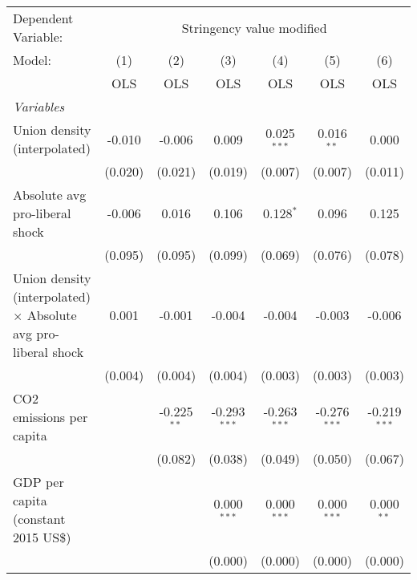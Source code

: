 
\begingroup
\centering
\begin{tabular}{lcccccc}
   \toprule
   Dependent Variable: & \multicolumn{6}{c}{Stringency value modified}\\
   Model:                                                                & (1)     & (2)           & (3)            & (4)            & (5)            & (6)\\  
                                                                         &  OLS    & OLS           & OLS            & OLS            & OLS            & OLS\\  
   \midrule
   \emph{Variables}\\
   Union density (interpolated)                                          & -0.010  & -0.006        & 0.009          & 0.025$^{***}$  & 0.016$^{**}$   & 0.000\\   
                                                                         & (0.020) & (0.021)       & (0.019)        & (0.007)        & (0.007)        & (0.011)\\   
   Absolute avg pro-liberal shock                                        & -0.006  & 0.016         & 0.106          & 0.128$^{*}$    & 0.096          & 0.125\\   
                                                                         & (0.095) & (0.095)       & (0.099)        & (0.069)        & (0.076)        & (0.078)\\   
   Union density (interpolated) $\times$ Absolute avg pro-liberal shock  & 0.001   & -0.001        & -0.004         & -0.004         & -0.003         & -0.006\\   
                                                                         & (0.004) & (0.004)       & (0.004)        & (0.003)        & (0.003)        & (0.003)\\   
   CO2 emissions per capita                                              &         & -0.225$^{**}$ & -0.293$^{***}$ & -0.263$^{***}$ & -0.276$^{***}$ & -0.219$^{***}$\\   
                                                                         &         & (0.082)       & (0.038)        & (0.049)        & (0.050)        & (0.067)\\   
   GDP per capita (constant 2015 US\$)                                   &         &               & 0.000$^{***}$  & 0.000$^{***}$  & 0.000$^{***}$  & 0.000$^{**}$\\   
                                                                         &         &               & (0.000)        & (0.000)        & (0.000)        & (0.000)\\   

\end{tabular}
